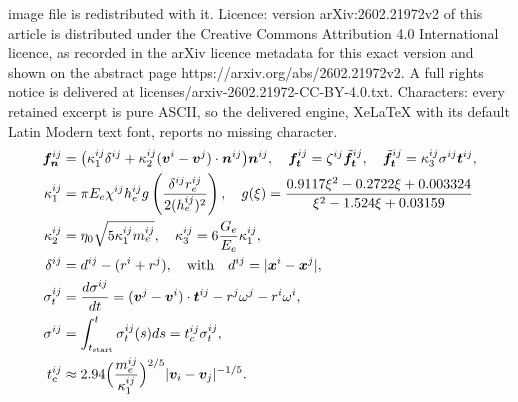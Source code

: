 \documentclass[10pt,a4paper]{amsart}
\def\d{{  \rm d}}
\newcommand{\bff}{\boldsymbol{f}}
\newcommand{\bfn}{\boldsymbol{n}}
\newcommand{\bft}{\boldsymbol{t}}
\newcommand{\bfv}{\boldsymbol{v}}
\newcommand{\bfx}{\boldsymbol{x}}
\begin{document}
image file is redistributed with it. Licence: version arXiv:2602.21972v2 of this article is distributed under the Creative Commons Attribution 4.0 International licence, as recorded in the arXiv licence metadata for this exact version and shown on the abstract page https://arxiv.org/abs/2602.21972v2. A full rights notice is delivered at licenses/arxiv-2602.21972-CC-BY-4.0.txt. Characters: every retained excerpt is pure ASCII, so the delivered engine, XeLaTeX with its default Latin Modern text font, reports no missing character.
\begin{subequations}\label{eq:demparm}
\begin{align} 
    \bff_{\bfn}^{ij} & = \big( \kappa^{ij}_1 \delta^{ij} + \kappa^{ij}_2 (\bfv^i  - \bfv^j )\cdot\bfn^{ij} \big) \bfn^{ij}, \quad
     \bff_{\bft}^{ij}  = \zeta^{ij} \tilde{\bff}_{\bft}^{ij}, \quad  \tilde{\bff}_{\bft}^{ij} = \kappa^{ij}_3 \sigma^{ij} \bft^{ij}, \label{eq:prmfnft} \\
     \kappa^{ij}_1 & = \pi E_e \chi^{ij} h^{ij}_e g\left(\frac{ \delta^{ij} r_e^{ij}}{2(h^{ij}_e)^2} \right), \quad g(\xi) = \frac{0.9117\xi^2 - 0.2722\xi + 0.003324}{\xi^2 - 1.524\xi + 0.03159} \label{eq:prmk1g} \\
     \kappa^{ij}_2 & = \eta_0 \sqrt{ 5 \kappa^{ij}_1 m^{ij}_e}, \quad \kappa^{ij}_3 = 6 \frac{G_e}{E_e}\kappa^{ij}_1,  \label{eq:prmk2k3} \\
     \delta^{ij} & = d^{ij} - (r^i+r^j), 
    \quad\mbox{with}\quad d^{ij} = |\bfx^i-\bfx^j|, \label{eq:prmdelt} \\
     \sigma^{ij}_t & = \frac{\d \sigma^{ij}}{\d t} = (\bfv^j - \bfv^i)\cdot\bft^{ij} - r^j\omega^j - r^i\omega^i, \label{eq:prmsigt} \\ 
     \sigma^{ij} & = \int_{t_\text{start}}^t \sigma^{ij}_t(s) \d s  = t_c^{ij} \sigma^{ij}_t, \label{eq:prmsig} \\
     t_c^{ij} & \approx 2.94 \Big(\frac{m_e^{ij}}{\kappa_1^{ij}} \Big)^{2/5} |\bfv_i - \bfv_j|^{-1/5}.  \label{eq:prmtc}
\end{align}
\end{subequations}
\end{document}
